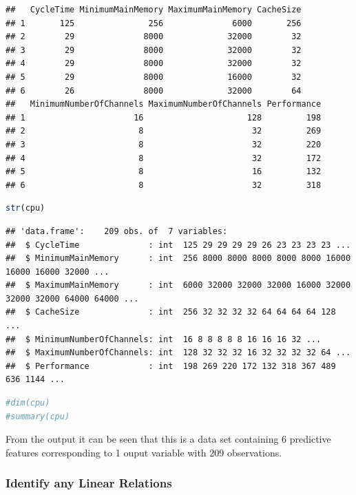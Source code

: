 \documentclass[
]{article}
\begin{document}
\begin{lstlisting}
##   CycleTime MinimumMainMemory MaximumMainMemory CacheSize
## 1       125               256              6000       256
## 2        29              8000             32000        32
## 3        29              8000             32000        32
## 4        29              8000             32000        32
## 5        29              8000             16000        32
## 6        26              8000             32000        64
##   MinimumNumberOfChannels MaximumNumberOfChannels Performance
## 1                      16                     128         198
## 2                       8                      32         269
## 3                       8                      32         220
## 4                       8                      32         172
## 5                       8                      16         132
## 6                       8                      32         318
\end{lstlisting}

\begin{lstlisting}[language=R]
str(cpu)
\end{lstlisting}

\begin{lstlisting}
## 'data.frame':    209 obs. of  7 variables:
##  $ CycleTime              : int  125 29 29 29 29 26 23 23 23 23 ...
##  $ MinimumMainMemory      : int  256 8000 8000 8000 8000 8000 16000 16000 16000 32000 ...
##  $ MaximumMainMemory      : int  6000 32000 32000 32000 16000 32000 32000 32000 64000 64000 ...
##  $ CacheSize              : int  256 32 32 32 32 64 64 64 64 128 ...
##  $ MinimumNumberOfChannels: int  16 8 8 8 8 8 16 16 16 32 ...
##  $ MaximumNumberOfChannels: int  128 32 32 32 16 32 32 32 32 64 ...
##  $ Performance            : int  198 269 220 172 132 318 367 489 636 1144 ...
\end{lstlisting}

\begin{lstlisting}[language=R]
#dim(cpu)
#summary(cpu)
\end{lstlisting}

From the output it can be seen that this is a data set containing 6
predictive features corresponding to 1 ouput variable with 209
observations.

\hypertarget{identify-any-linear-relations}{%
\subsubsection{Identify any Linear
Relations}\label{identify-any-linear-relations}}
\end{document}

